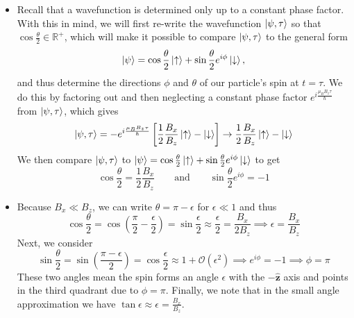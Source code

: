 \documentclass[11pt, a4paper]{article}
\newcommand{\eqtext}[1]{\qquad \text{#1} \qquad}
\newcommand{\Ham}{Hamiltonian\xspace}
\renewcommand{\vec}[1]{\bm{#1}} %
\newcommand{\uvec}[1]{\hat{\vec{#1}}} %
\newcommand{\p}{\psi}  %
\newcommand{\ua}{\uparrow}  %
\newcommand{\da}{\downarrow}  %
\begin{document}
\begin{itemize}
	\item Recall that a wavefunction is determined only up to a constant phase factor. With this in mind, we will first re-write the wavefunction $ \ket{\p, \tau} $ so that $ \cos \frac{\theta}{2} \in \mathbb{R}^{+} $, which will make it possible to compare $ \ket{\p, \tau} $ to the general form
	\begin{equation*}
		\ket{\p} = \cos \frac{\theta}{2}\ket{\ua} + \sin \frac{\theta}{2}e^{i\phi}\ket{\da},
	\end{equation*}
	and thus determine the directions $ \phi $ and $ \theta $ of our particle's spin at $ t = \tau $. We do this by factoring out and then neglecting a constant phase factor $ e^{i\frac{\mu_{B}B_{z}\tau}{\hbar}} $ from $ \ket{\p, \tau} $, which gives
	\begin{equation*}
		\ket{\p, \tau} = - e^{i\frac{\mu_{B}B_{z}\tau}{\hbar}}\left[\frac{1}{2}\frac{B_{x}}{B_{z}}\ket{\ua} - \ket{\da}\right] \to \frac{1}{2}\frac{B_{x}}{B_{z}}\ket{\ua} - \ket{\da}
	\end{equation*}
	We then compare $ \ket{\p, \tau} $ to $ \ket{\p} = \cos \frac{\theta}{2}\ket{\ua} + \sin \frac{\theta}{2}e^{i\phi}\ket{\da} $ to get
	\begin{equation*}
		\cos \frac{\theta}{2} = \frac{1}{2}\frac{B_{x}}{B_{z}} \eqtext{and} \sin \frac{\theta}{2}e^{i\phi} = - 1
	\end{equation*}
	
	\item Because $ B_{x} \ll B_{z} $, we can write $ \theta = \pi - \epsilon $ for $ \epsilon \ll 1 $ and thus
	\begin{equation*}
		\cos \frac{\theta}{2} = \cos \left(\frac{\pi}{2} - \frac{\epsilon}{2}\right) = \sin \frac{\epsilon}{2} \approx \frac{\epsilon}{2} = \frac{B_{x}}{2B_{z}} \implies \epsilon = \frac{B_{x}}{B_{z}}
	\end{equation*}
	Next, we consider
	\begin{equation*}
		\sin \frac{\theta}{2} = \sin \left(\frac{\pi - \epsilon}{2}\right) = \cos \frac{\epsilon}{2} \approx 1 + \mathcal{O}(\epsilon^{2}) \implies e^{i\phi} = -1 \implies \phi = \pi
	\end{equation*} 
	These two angles mean the spin forms an angle $ \epsilon $ with the $ -\uvec{z} $ axis and points in the third quadrant due to $ \phi = \pi $. Finally, we note that in the small angle approximation we have $ \tan \epsilon \approx \epsilon = \frac{B_{x}}{B_{z}}$.
	

\end{itemize}
\end{document}
